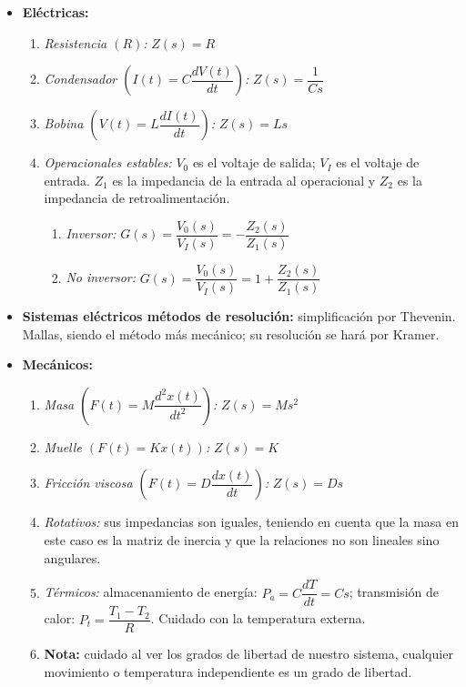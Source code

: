 \documentclass[a4paper, twocolumn, 10pt]{article}
\begin{document}
\begin{itemize}
	\item \textbf{Eléctricas:}
	\begin{enumerate}
		\item \textit{Resistencia $(R)$:} $Z(s) = R$
		\item \textit{Condensador $\left(I(t) = C\dfrac{dV(t)}{dt}\right)$:} $Z(s) = \dfrac{1}{Cs}$
		\item \textit{Bobina $\left(V(t) = L\dfrac{dI(t)}{dt}\right)$:} $Z(s) = Ls$
		\item \textit{Operacionales estables:} $V_0$ es el voltaje de salida; $V_I$ es el voltaje de entrada. $Z_1$ es la impedancia de la entrada al operacional y $Z_2$ es la impedancia de retroalimentación. 
		\begin{enumerate}
			\item \textit{Inversor:} $G(s) = \dfrac{V_0(s)}{V_I(s)} = -\dfrac{Z_2(s)}{Z_1(s)}$
			\item \textit{No inversor:} $G(s) = \dfrac{V_0(s)}{V_I(s)} = 1 + \dfrac{Z_2(s)}{Z_1(s)}$
		\end{enumerate}
	\end{enumerate}
	\item \textbf{Sistemas eléctricos métodos de resolución:} simplificación por Thevenin. Mallas, siendo el método más mecánico; su resolución se hará por Kramer.
	\item \textbf{Mecánicos:}
	\begin{enumerate}
		\item \textit{Masa $\left(F(t) = M\dfrac{d^2x(t)}{dt^2}\right)$:} $Z(s) = Ms^2$
		\item \textit{Muelle $(F(t) = Kx(t))$:} $Z(s) = K$
		\item \textit{Fricción viscosa $\left(F(t) = D\dfrac{dx(t)}{dt}\right)$:} $Z(s) = Ds$
		\item \textit{Rotativos:} sus impedancias son iguales, teniendo en cuenta que la masa en este caso es la matriz de inercia y que la relaciones no son lineales sino angulares.
		\item \textit{Térmicos:} almacenamiento de energía: $P_a = C\dfrac{dT}{dt} = Cs$; transmisión de calor: $P_t = \dfrac{T_1-T_2}{R}$. Cuidado con la temperatura externa.
		\item \textbf{Nota:} cuidado al ver los grados de libertad de nuestro sistema, cualquier movimiento o temperatura independiente es un grado de libertad.
	\end{enumerate}
	 
\end{itemize}
\end{document}

